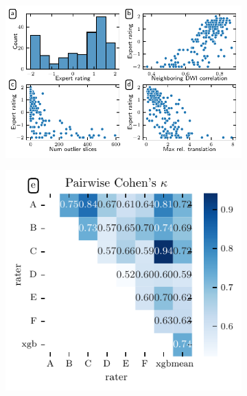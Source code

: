\documentclass[9pt,lineno]{elife}
\begin{document}
\begin{figure}[tbp]
\begin{fullwidth}
    {\label{fig:expert-qc:scatter:hist}}
    {\label{fig:expert-qc:scatter:ndc}}
    {\label{fig:expert-qc:scatter:translation}}
    {\label{fig:expert-qc:scatter:outliers}}
    {\label{fig:expert-qc:irr}}
    \begin{subfigure}{.6\linewidth}
    \centering
    \includegraphics[width=\linewidth]{community-qc/expert-qsiprep-pairplot.pdf}
    \end{subfigure}
    \begin{subfigure}{.4\linewidth}
    \centering
    \includegraphics[width=\linewidth]{community-qc/expert-raters-cohens-kappa.pdf}

\end{subfigure}
\end{fullwidth}
\end{figure}
\end{document}
